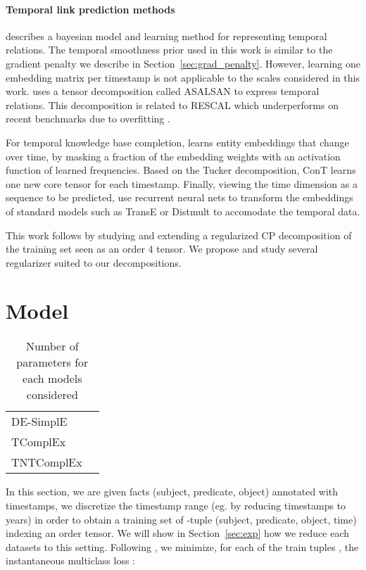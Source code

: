 \documentclass{article}
\begin{document}
\paragraph{Temporal link prediction methods}
\citet{sarkar2006dynamic} describes a bayesian model and learning method for representing temporal relations. The temporal smoothness prior used in this work is similar to the gradient penalty we describe in Section~\ref{sec:grad_penalty}. However, learning one embedding matrix per timestamp is not applicable to the scales considered in this work. \citet{bader2007temporal} uses a tensor decomposition called ASALSAN to express temporal relations. This decomposition is related to RESCAL \citep{nickel_three-way_2011} which underperforms on recent benchmarks due to overfitting \citep{nickel_holographic_2015}.

For temporal knowledge base completion, \citet{goel2019diachronic} learns entity embeddings that change over time, by masking a fraction of the embedding weights with an activation function of learned frequencies. Based on the Tucker decomposition, ConT \citep{ma2018embedding} learns one new core tensor for each timestamp. Finally, viewing the time dimension as a sequence to be predicted, \citet{garcia2018learning} use recurrent neural nets to transform the embeddings of standard models such as TransE or Distmult to accomodate the temporal data. 

This work follows \citet{lacroix2018canonical} by studying and extending a regularized CP decomposition of the training set seen as an order 4 tensor. We propose and study several regularizer suited to our decompositions.

\section{Model}
\begin{table}[t]
\centering
\begin{tabular}{lc}
\toprule
DE-SimplE &  \\
TComplEx &  \\
TNTComplEx &  \\
\bottomrule
\end{tabular}
\caption{Number of parameters for each models considered}
\label{tab:n_params}
\end{table}
In this section, we are given facts (subject, predicate, object) annotated with timestamps, we discretize the timestamp range (eg. by reducing timestamps to years) in order to obtain a training set of -tuple (subject, predicate, object, time) indexing an order  tensor. We will show in Section~\ref{sec:exp} how we reduce each datasets to this setting. Following \citet{lacroix2018canonical}, we minimize, for each of the train tuples , the instantaneous multiclass loss : 
\end{document}
